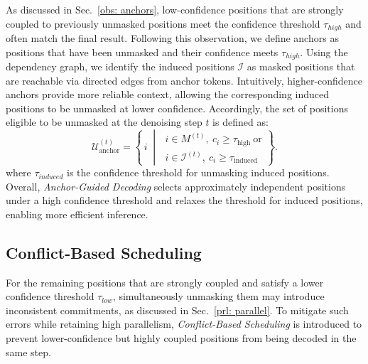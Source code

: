 As discussed in Sec.~\ref{obs: anchors}, low-confidence positions that are strongly coupled to previously unmasked positions meet the confidence threshold $\tau_{high}$ and often match the final result. Following this observation, we define anchors as positions that have been unmasked and their confidence meets $\tau_{high}$. Using the dependency graph, we identify the induced positions $\mathcal{I}$ as masked positions that are reachable via directed edges from anchor tokens. Intuitively, higher-confidence anchors provide more reliable context, allowing the corresponding induced positions to be unmasked at lower confidence. Accordingly, the set of positions eligible to be unmasked at the denoising step $t$ is defined as:
\begin{equation*}
\mathcal{U}^{(t)}_{\text{anchor}}
=
\left\{
\, i \;\middle|\;
\begin{array}{l}
i \in M^{(t)},\ c_i \ge \tau_{\text{high}}
\ \text{or}\\
i \in \mathcal{I}^{(t)},\ c_i \ge \tau_{\text{induced}}
\end{array}
\right\}.
\end{equation*}
where $\tau_{induced}$ is the confidence threshold for unmasking induced positions. 
Overall, \textit{Anchor-Guided Decoding} selects approximately independent positions under a high confidence threshold and relaxes the threshold for induced positions, enabling more efficient inference.

\subsection{Conflict-Based Scheduling}
For the remaining positions that are strongly coupled and satisfy a lower confidence threshold $\tau_{low}$, simultaneously unmasking them may introduce inconsistent commitments, as discussed in Sec.~\ref{prl: parallel}. To mitigate such errors while retaining high parallelism, \textit{Conflict-Based Scheduling} is introduced to prevent lower-confidence but highly coupled positions from being decoded in the same step.

